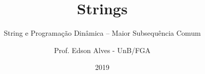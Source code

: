\title{Strings}
\subtitle{String e Programação Dinâmica -- Maior Subsequência Comum}
\author{Prof. Edson Alves - UnB/FGA}
\date{2019}
